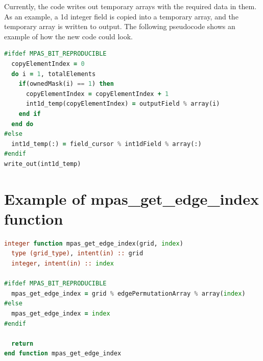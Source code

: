\documentclass[11pt]{report}
\begin{document}
Currently, the code writes out temporary arrays with the required data in them. As an example, a 1d integer field is copied into a temporary array, and the temporary array is written to output. The following pseudocode shows an example of how the new code could look.

\begin{lstlisting}[language=fortran,escapechar=@]
#ifdef MPAS_BIT_REPRODUCIBLE
  copyElementIndex = 0
  do i = 1, totalElements
    if(ownedMask(i) == 1) then
	  copyElementIndex = copyElementIndex + 1
      int1d_temp(copyElementIndex) = outputField % array(i)
	end if
  end do
#else
  int1d_temp(:) = field_cursor % int1dField % array(:)
#endif
write_out(int1d_temp)
\end{lstlisting}

\section{Example of mpas\_get\_edge\_index function}

\begin{lstlisting}[language=fortran,escapechar=@]
integer function mpas_get_edge_index(grid, index)
  type (grid_type), intent(in) :: grid
  integer, intent(in) :: index

#ifdef MPAS_BIT_REPRODUCIBLE
  mpas_get_edge_index = grid % edgePermutationArray % array(index)
#else
  mpas_get_edge_index = index
#endif

  return
end function mpas_get_edge_index
\end{lstlisting}

\end{document}
